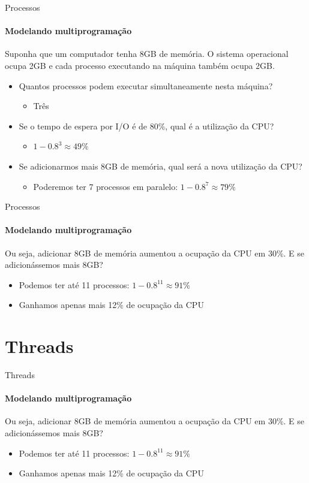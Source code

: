 \documentclass{beamer}
\begin{document}
 \begin{frame}{Processos}
  	\framesubtitle{Modelando multiprogramação}
  	Suponha que um computador tenha 8GB de memória. O sistema operacional ocupa 2GB e cada processo executando na máquina também ocupa 2GB.
  	\begin{itemize}
  		\item Quantos processos podem executar simultaneamente nesta máquina? \pause
  		\begin{itemize}
  			\item Três
  		\end{itemize}
  		\item Se o tempo de espera por I/O é de 80\%, qual é a utilização da CPU? \pause
  		\begin{itemize}
  			\item $1 - 0.8^{3} \approx 49\%$
  		\end{itemize}
  		\item Se adicionarmos mais 8GB de memória, qual será a nova utilização da CPU?
  		\begin{itemize}
  			\item Poderemos ter 7 processos em paralelo: $1-0.8^{7} \approx 79\%$
  		\end{itemize}
  	\end{itemize}
  \end{frame}
  \begin{frame}{Processos}
   	\framesubtitle{Modelando multiprogramação}
   	Ou seja, adicionar 8GB de memória aumentou a ocupação da CPU em 30\%. E se adicionássemos mais 8GB? \pause
   	\begin{itemize}
   		\item Podemos ter até 11 processos: $1 - 0.8^{11} \approx 91\%$
   		\item Ganhamos apenas mais 12\% de ocupação da CPU
   	\end{itemize}
\end{frame}
\section{Threads}
\begin{frame}{Threads}
	\framesubtitle{Modelando multiprogramação}
	Ou seja, adicionar 8GB de memória aumentou a ocupação da CPU em 30\%. E se adicionássemos mais 8GB? \pause
	\begin{itemize}
		\item Podemos ter até 11 processos: $1 - 0.8^{11} \approx 91\%$
		\item Ganhamos apenas mais 12\% de ocupação da CPU
	\end{itemize}
\end{frame}
\end{document}
